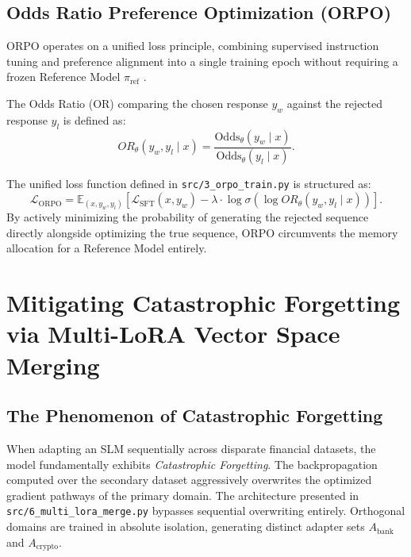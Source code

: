 \documentclass[12pt,a4paper]{report}
\newcommand{\E}{\mathbb{E}}
\newcommand{\Loss}{\mathcal{L}}
\begin{document}
\section{Odds Ratio Preference Optimization (ORPO)}

ORPO operates on a unified loss principle, combining supervised instruction tuning and preference alignment into a single training epoch without requiring a frozen Reference Model $\pi_{\text{ref}}$ \cite{hong2024orpo}.

The Odds Ratio (OR) comparing the chosen response $y_w$ against the rejected response $y_l$ is defined as:
\begin{equation}
    OR_\theta(y_w, y_l \mid x) = \frac{\text{Odds}_\theta(y_w \mid x)}{\text{Odds}_\theta(y_l \mid x)}.
\end{equation}

The unified loss function defined in \texttt{src/3_orpo_train.py} is structured as:
\begin{equation}
    \Loss_{\text{ORPO}} = \E_{(x, y_w, y_l)} \left[ \Loss_{\text{SFT}}(x, y_w) - \lambda \cdot \log \sigma (\log OR_\theta(y_w, y_l \mid x)) \right].
\end{equation}
By actively minimizing the probability of generating the rejected sequence directly alongside optimizing the true sequence, ORPO circumvents the memory allocation for a Reference Model entirely.

\chapter{Mitigating Catastrophic Forgetting via Multi-LoRA Vector Space Merging}
\label{chap:lora_merging}

\section{The Phenomenon of Catastrophic Forgetting}

When adapting an SLM sequentially across disparate financial datasets, the model fundamentally exhibits \textit{Catastrophic Forgetting}. The backpropagation computed over the secondary dataset aggressively overwrites the optimized gradient pathways of the primary domain. The architecture presented in \texttt{src/6_multi_lora_merge.py} bypasses sequential overwriting entirely. Orthogonal domains are trained in absolute isolation, generating distinct adapter sets $A_{\text{bank}}$ and $A_{\text{crypto}}$.
\end{document}
